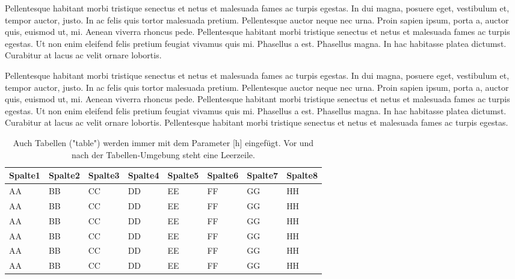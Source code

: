 Pellentesque habitant morbi tristique senectus et netus et malesuada fames ac turpis egestas. In dui magna, posuere eget, vestibulum et, tempor auctor, justo. In ac felis quis tortor malesuada pretium. Pellentesque auctor neque nec urna. Proin sapien ipsum, porta a, auctor quis, euismod ut, mi. Aenean viverra rhoncus pede. Pellentesque habitant morbi tristique senectus et netus et malesuada fames ac turpis egestas. Ut non enim eleifend felis pretium feugiat vivamus quis mi. Phasellus a est. Phasellus magna. In hac habitasse platea dictumst. Curabitur at lacus ac velit ornare lobortis.

Pellentesque habitant morbi tristique senectus et netus et malesuada fames ac turpis egestas. In dui magna, posuere eget, vestibulum et, tempor auctor, justo. In ac felis quis tortor malesuada pretium. Pellentesque auctor neque nec urna. Proin sapien ipsum, porta a, auctor quis, euismod ut, mi. Aenean viverra rhoncus pede. Pellentesque habitant morbi tristique senectus et netus et malesuada fames ac turpis egestas. Ut non enim eleifend felis pretium feugiat vivamus quis mi. Phasellus a est. Phasellus magna. In hac habitasse platea dictumst. Curabitur at lacus ac velit ornare lobortis. Pellentesque habitant morbi tristique senectus et netus et malesuada fames ac turpis egestas.


\begin{table}[h] %
	\caption{Auch Tabellen ("table") werden immer mit dem Parameter [h] eingefügt. Vor und nach der Tabellen-Umgebung steht eine Leerzeile.}
	\begin{tabularx}{\textwidth}{XXXXXXXX} \toprule
		Spalte1 & Spalte2 & Spalte3 & Spalte4 & Spalte5
		& Spalte6 & Spalte7 & Spalte8 \\ \midrule
		AA      & BB      & CC      & DD      &
		EE      & FF      & GG      & HH       \\
		AA      & BB      & CC      & DD
		& EE      & FF      & GG      & HH    \\
		AA      & BB      & CC      & DD
		& EE      & FF      & GG      & HH    \\
		AA      & BB      & CC      & DD
		& EE      & FF      & GG      & HH    \\
		AA      & BB      & CC      & DD
		& EE      & FF      & GG      & HH    \\
		AA      & BB      & CC      & DD
		& EE      & FF      & GG      & HH     \\ \bottomrule
	\end{tabularx}
\end{table}

